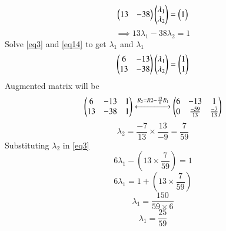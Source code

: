 \documentclass[journal,12pt,twocolumn]{IEEEtran}
\begin{document}
\begin{equation}
    \begin{pmatrix}13 & -38\end{pmatrix}\begin{pmatrix}\lambda{_1}\\\lambda{_2}\end{pmatrix} = \begin{pmatrix}1\end{pmatrix}
\end{equation}
\begin{equation}\label{eq14}
    \implies13\lambda{_1} - 38\lambda{_2} = 1
\end{equation}
Solve \eqref{eq3} and \eqref{eq14} to get $\lambda{_1}$ and $\lambda{_1}$
\begin{equation}
    \begin{pmatrix}6 & -13\\13 & -38\end{pmatrix}\begin{pmatrix}\lambda{_1}\\\lambda{_2}\end{pmatrix} = \begin{pmatrix}1\\1\end{pmatrix} 
\end{equation}
Augmented matrix will be
\begin{equation}
    \begin{pmatrix}6 & -13 & 1\\13 & -38 & 1\end{pmatrix}\xleftrightarrow[]{R_2 = R2 - \frac{13}{6}R_1}\begin{pmatrix}6 & -13 & 1\\0 & \frac{-59}{13} & \frac{-7}{13}\end{pmatrix}
\end{equation}
\begin{equation}
    \lambda{_2} = \frac{-7}{13} \times \frac{13}{-9}  = \frac{7}{59}
\end{equation}
Substituting $\lambda{_2}$ in \eqref{eq3}
\begin{equation}
    6\lambda{_1} - \left(13 \times \frac{7}{59}\right) = 1
\end{equation}
\begin{equation}
    6\lambda{_1} = 1 + \left(13 \times \frac{7}{59}\right)
\end{equation}
\begin{equation}
    \lambda{_1} = \frac{150}{59 \times 6}
\end{equation}
\begin{equation}
    \lambda{_1} = \frac{25}{59}
\end{equation}
\end{document}
